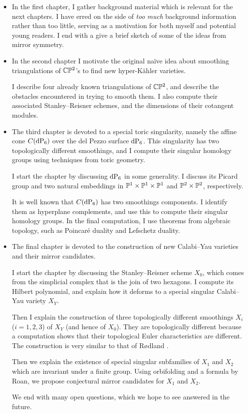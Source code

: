 \begin{itemize}
\item In the first chapter, I gather background material which is relevant for the next chapters. I have erred on the side of \emph{too much} background information rather than too little, serving as a motivation for both myself and potential young readers. I end with a give a brief sketch of some of the ideas from mirror symmetry.

\item In the second chapter I motivate the original naïve idea about smoothing triangulations of $\C \P^2$'s to find new hyper-Kähler varieties.

I describe four already known triangulations of $\C \P^2$, and describe the obstacles encountered in trying to smooth them. I also compute their associated Stanley--Reisner schemes, and the dimensions of their cotangent modules.

\item The third chapter is devoted to a special toric singularity, namely the affine cone $C(\dP6)$ over the del Pezzo surface $\dP6$. This singularity has two topologically different smoothings, and I compute their singular homology groups using techniques from toric geometry.

I start the chapter by discussing $\dP6$ in some generality. I discuss its Picard group and two natural embeddings in $\P^1 \times \P^1 \times \P^1$ and $\P^2 \times \P^2$, respectively.

It is well known that $C(\dP6)$ has two smoothings components. I identify them as hyperplane complements, and use this to compute their singular homology groups. In the final computation, I use theorems from algebraic topology, such as Poincaré duality and Lefschetz duality. 

\item The final chapter is devoted to the construction of new Calabi--Yau varieties and their mirror candidates.

I start the chapter by discussing the Stanley--Reisner scheme $X_0$, which comes from the simplicial complex that is the join of two hexagons. I compute its Hilbert polynomial, and explain how it deforms to a special singular Calabi--Yau variety $X_Y$.

Then I explain the construction of three topologically different smoothings $X_i$ ($i=1,2,3$) of $X_Y$ (and hence of $X_0$). They are topologically different because a \MM computation shows that their topological Euler characteristics are different. The construction is very similar to that of Rødland \cite{rodland_pfaffian}.

Then we explain the existence of special singular subfamilies of $X_1$ and $X_2$ which are invariant under a finite group. Using orbifolding and a formula by Roan, we propose conjectural mirror candidates for $X_1$ and $X_2$.

We end with many open questions, which we hope to see answered in the future.
\end{itemize}

